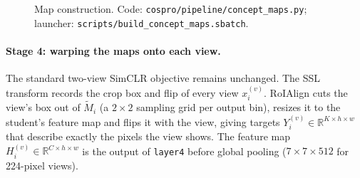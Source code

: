 \documentclass[11pt]{article}
\begin{document}
\begin{figure}[H]
\centering
{}
\caption{Map construction. Code: \texttt{cospro/pipeline/concept\_maps.py}; launcher:
\texttt{scripts/build\_concept\_maps.sbatch}.}
\label{fig:maps}
\end{figure}

\paragraph{Stage 4: warping the maps onto each view.} The standard two-view SimCLR objective remains unchanged. The
SSL transform records the crop box and flip of every view $x_i^{(v)}$. RoIAlign \citep{he2017maskrcnn} cuts the view's
box out of $\tilde M_i$ (a $2\times2$ sampling grid per output bin), resizes it to the student's feature map and flips
it with the view, giving targets $Y_i^{(v)}\in\mathbb R^{K\times h\times w}$ that describe exactly the pixels the view
shows. The feature map $H_i^{(v)}\in\mathbb{R}^{C\times h\times w}$ is the output of \texttt{layer4} before global
pooling ($7\times7\times512$ for 224-pixel views).
\end{document}
